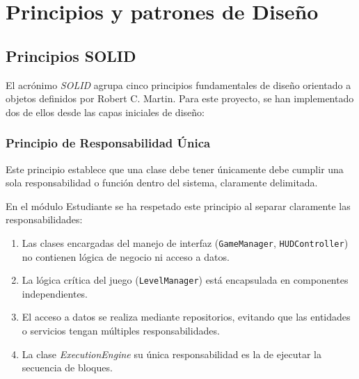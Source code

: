 

\section{Principios y patrones de Diseño}

\subsection{Principios SOLID}

El acrónimo \textit{SOLID} agrupa cinco principios fundamentales de diseño orientado a objetos definidos por Robert C. Martin. Para este proyecto, se han implementado dos de ellos desde las capas iniciales de diseño:

\subsubsection{Principio de Responsabilidad Única}

Este principio establece que una clase debe tener únicamente debe cumplir una sola responsabilidad o función dentro del sistema, claramente delimitada.

En el módulo Estudiante se ha respetado este principio al separar claramente las responsabilidades:

\begin{enumerate}
	\item Las clases encargadas del manejo de interfaz (\texttt{GameManager}, \texttt{HUDController}) no contienen lógica de negocio ni acceso a datos.
	
	\item La lógica crítica del juego (\texttt{LevelManager}) está encapsulada en componentes independientes.
	
	\item El acceso a datos se realiza mediante repositorios, evitando que las entidades o servicios tengan múltiples responsabilidades.
	
	\item La clase \textit{ExecutionEngine} su única responsabilidad es la de ejecutar la secuencia de bloques.
\end{enumerate}

